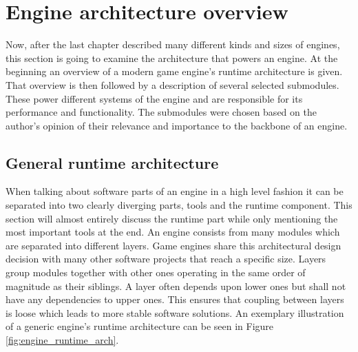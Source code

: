 \chapter{Engine architecture overview}

Now, after the last chapter described many different kinds and sizes of engines, this section is going to examine the architecture that powers an engine. At the beginning an overview of a modern game engine's runtime architecture is given. That overview is then followed by a description of several selected submodules. These power different systems of the engine and are responsible for its performance and functionality. The submodules were chosen based on the author's opinion of their relevance and importance to the backbone of an engine.

\section{General runtime architecture}

When talking about software parts of an engine in a high level fashion it can be separated into two clearly diverging parts, tools and the runtime component. This section will almost entirely discuss the runtime part while only mentioning the most important tools at the end. An engine consists from many modules which are separated into different layers. Game engines share this architectural design decision with many other software projects that reach a specific size. Layers group modules together with other ones operating in the same order of magnitude as their siblings. A layer often depends upon lower ones but shall not have any dependencies to upper ones. This ensures that coupling between layers is loose which leads to more stable software solutions. An exemplary illustration of a generic engine's runtime architecture can be seen in Figure \ref{fig:engine_runtime_arch}.

